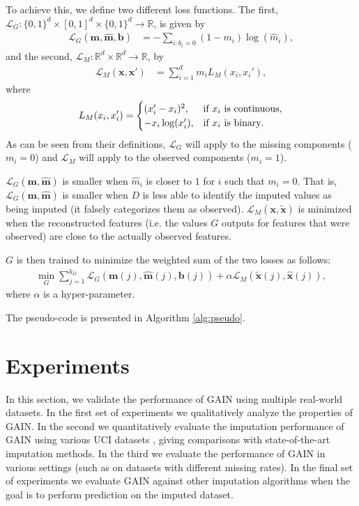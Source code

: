 \documentclass{article}
\begin{document}
To achieve this, we define two different loss functions. The first, $\mathcal{L}_G : \{0, 1\}^d \times [0, 1]^d \times \{0, 1\}^d \to \mathbb{R}$, is given by
\begin{align}
 \mathcal{L}_G(\mathbf{m},\hat{\mathbf{m}}, \mathbf{b})&=-\sum_{i : b_i = 0}(1-m_{i})\log(\hat{m}_{i}),
\end{align}
and the second, $\mathcal{L}_M : \mathbb{R}^d \times \mathbb{R}^d \to \mathbb{R}$, by
\begin{align}
 \mathcal{L}_M(\mathbf{x},\mathbf{x}')&=\sum_{i=1}^{d}m_i L_M(x_{i},{x}_{i}'),
\end{align}
where
\[
 L_{M}(x_i,x_i')=\begin{cases}
(x_{i}'-x_{i})^{2}, & \text{if \ensuremath{x_i} is continuous},\\
-x_{i}\log(x_{i}'), & \text{if \ensuremath{x_i} is binary}.
\end{cases}
\]
As can be seen from their definitions, $\mathcal{L}_G$ will apply to the missing components ($m_i = 0$) and $\mathcal{L}_M$ will apply to the observed components ($m_i = 1$).

$\mathcal{L}_{G}(\mathbf{m},{\hat{\mathbf{m}}})$ is smaller when $\hat{m}_i$ is closer to $1$ for $i$ such that $m_i = 0$. That is, $\mathcal{L}_{G}(\mathbf{m},{\hat{\mathbf{m}}})$ is smaller when $D$ is less able to identify the imputed values as being imputed (it falsely categorizes them as observed). $\mathcal{L}_{M}(\mathbf{x},{\tilde{\mathbf{x}}})$ is minimized when the reconstructed features (i.e. the values $G$ outputs for features that were observed) are close to the actually observed features.

$G$ is then trained to minimize the weighted sum of the two losses as follows:
\begin{align*}\label{eq:optG}
\min_{G}\sum_{j=1}^{k_{G}}\mathcal{L}_{G}(\mathbf{m}(j),\hat{\mathbf{m}}(j), \mathbf{b}(j))+\alpha\mathcal{L}_{M}(\tilde{\mathbf{x}}(j), \hat{\mathbf{x}}(j)),
\end{align*}
where $\alpha$ is a hyper-parameter. 

The pseudo-code is presented in Algorithm \ref{alg:pseudo}.


\section{Experiments}\label{sect:experiments}
In this section, we validate the performance of GAIN using multiple real-world datasets. In the first set of experiments we qualitatively analyze the properties of GAIN. In the second we quantitatively evaluate the imputation performance of GAIN using various UCI datasets \cite{UCI}, giving comparisons with state-of-the-art imputation methods. In the third we evaluate the performance of GAIN in various settings (such as on datasets with different missing rates). In the final set of experiments we evaluate GAIN against other imputation algorithms when the goal is to perform prediction on the imputed dataset.
\end{document}
